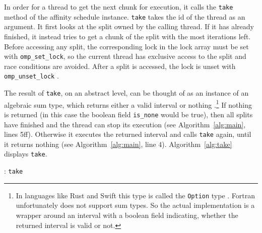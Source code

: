 \documentclass[twoside,11pt]{article}
\begin{document}
In order for a thread to get the next chunk for execution,
it calls the \texttt{take} method of the affinity schedule
instance.
\texttt{take} takes the id of the thread as an argument.
It first looks at the split owned by the calling thread.
If it has already finished, it instead tries to get a
chunk of the split with the most iterations left.
Before accessing any split, the corresponding lock in the
lock array must be set with \texttt{omp\_set\_lock}, so
the current thread has exclusive access to the split and
race conditions are avoided.
After a split is accessed, the lock is unset with
\texttt{omp\_unset\_lock} \citep[see][Chapter 3]{omp}.

The result of \texttt{take}, on an abstract level, can be
thought of as an instance of an algebraic sum type, which
returns either a valid interval or nothing
\citep[for sum types see e.g.][]{sum_types}.\footnote{%
  In languages like Rust and Swift this type is called the
  \texttt{Option} type \citep[see][]{rust, swift}.
  Fortran unfortunately does not support sum types. So
  the actual implementation is a wrapper around an interval
  with a boolean field indicating, whether the returned
  interval is valid or not.}
If nothing is returned (in this case the boolean field
\texttt{is\_none} would be true), then all splits have
finished and the thread can stop its execution
(see Algorithm~\ref{alg:main}, lines 5ff).
Otherwise it executes the returned interval and calls
\texttt{take} again, until it returns nothing
(see Algorithm~\ref{alg:main}, line 4).
Algorithm~\ref{alg:take} displays \texttt{take}.

\begin{algorithm}
  \caption{: \texttt{take}}
  \label{alg:take}

  \begin{algorithmic}[1]
    \ELSE
    \ENDIF
  \end{algorithmic}
\end{algorithm}
\end{document}
